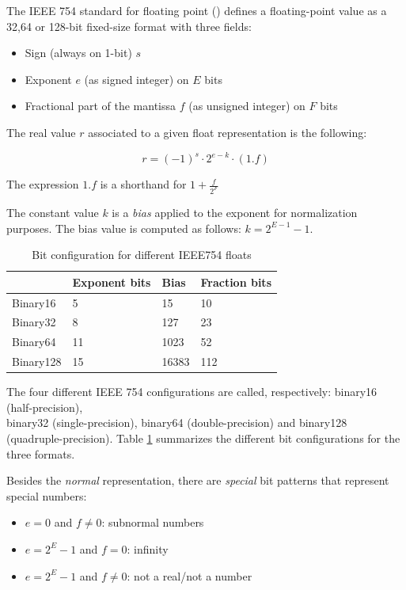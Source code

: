 The IEEE 754 standard for floating point (\cite{893287}) defines a floating-point value as a 32,64 or 128-bit fixed-size format with three fields:
\begin{itemize}
    \item Sign (always on 1-bit) $s$
    \item Exponent $e$ (as signed integer) on $E$ bits
    \item Fractional part of the mantissa $f$ (as unsigned integer) on $F$ bits
\end{itemize}

The real value $r$ associated to a given float representation is the following:

\begin{equation}\label{eqn:float2real}
    r = (-1)^s \cdot 2^{e-k} \cdot (1.f)
\end{equation}

The expression $1.f$ is a shorthand for $1 + \frac{f}{2^F}$

The constant value $k$ is a \textit{bias} applied to the exponent for normalization purposes. The bias value is computed as follows: $k = 2^{E-1} - 1$.



\begin{table}[b]
\centering
\caption{Bit configuration for different IEEE754 floats}
\label{tab:ieee754configs}
\begin{tabular}{l|lll}
\hline
          & Exponent bits & Bias  & Fraction bits \\ \hline
Binary16 &  5             & 15    & 10            \\ \hline
Binary32  & 8             & 127   & 23            \\ \hline
Binary64  & 11            & 1023  & 52            \\ \hline
Binary128 & 15            & 16383 & 112           \\ \hline
\end{tabular}
\end{table}

The four different IEEE 754 configurations are called, respectively: binary16 (half-precision), \\binary32 (single-precision), binary64 (double-precision) and binary128 (quadruple-precision). Table \ref{tab:ieee754configs} summarizes the different bit configurations for the three formats.

Besides the \textit{normal} representation, there are \textit{special} bit patterns that represent special numbers:
\begin{itemize}
    \item $e = 0$ and $f \neq 0$: subnormal numbers
    \item $e = 2^{E} - 1$ and $f = 0$: infinity
    \item $e = 2^{E} - 1$ and $f \neq 0$: not a real/not a number
\end{itemize}

